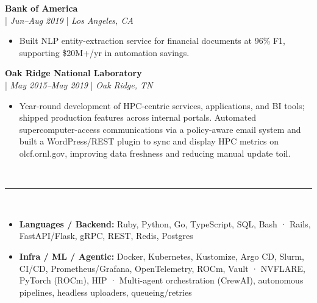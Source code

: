 \documentclass[11pt,a4paper]{article}
\newcommand{\resumesection}[1]{
    \vspace{3pt}                                    %
    \noindent{\fontsize{13.65}{16}\selectfont\textbf{#1}}\\[-8pt]                    %
    \noindent\textcolor{gray}{\rule{\textwidth}{2pt}}\\[-5pt]  %
    \vspace{-8pt}                                   %
}
\newcommand{\regbullet}[1]{
    \item {\fontsize{10}{12}\selectfont #1}
}
\begin{document}
\vspace{8pt}
\noindent\textbf{Bank of America}\\
  |  {\fontsize{10}{12}\selectfont\textit{Jun--Aug 2019}}  |  {\fontsize{10}{12}\selectfont\textit{Los Angeles, CA}}
\begin{itemize}[leftmargin=18pt,itemsep=1pt,topsep=0pt]
\regbullet{Built NLP entity-extraction service for financial documents at 96\% F1, supporting \$20M+/yr in automation savings.}
\end{itemize}

\vspace{8pt}
\noindent\textbf{Oak Ridge National Laboratory}\\
  |  {\fontsize{10}{12}\selectfont\textit{May 2015--May 2019}}  |  {\fontsize{10}{12}\selectfont\textit{Oak Ridge, TN}}
\begin{itemize}[leftmargin=18pt,itemsep=1pt,topsep=0pt]
\regbullet{Year-round development of HPC-centric services, applications, and BI tools; shipped production features across internal portals. Automated supercomputer-access communications via a policy-aware email system and built a WordPress/REST plugin to sync and display HPC metrics on olcf.ornl.gov, improving data freshness and reducing manual update toil.}
\end{itemize}
\vspace{4pt}


\resumesection{Skills}

\begin{itemize}[leftmargin=18pt,itemsep=1pt,topsep=0pt]
\regbullet{\textbf{Languages / Backend:} Ruby, Python, Go, TypeScript, SQL, Bash · Rails, FastAPI/Flask, gRPC, REST, Redis, Postgres}

\regbullet{\textbf{Infra / ML / Agentic:} Docker, Kubernetes, Kustomize, Argo CD, Slurm, CI/CD, Prometheus/Grafana, OpenTelemetry, ROCm, Vault · NVFLARE, PyTorch (ROCm), HIP · Multi-agent orchestration (CrewAI), autonomous pipelines, headless uploaders, queueing/retries}
\end{itemize}
\vspace{4pt}
\end{document}
